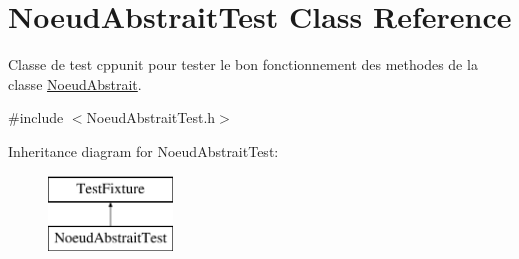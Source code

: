 \hypertarget{class_noeud_abstrait_test}{\section{Noeud\-Abstrait\-Test Class Reference}
\label{class_noeud_abstrait_test}
}


Classe de test cppunit pour tester le bon fonctionnement des methodes de la classe \hyperlink{class_noeud_abstrait}{Noeud\-Abstrait}.  




{\ttfamily \#include $<$Noeud\-Abstrait\-Test.\-h$>$}

Inheritance diagram for Noeud\-Abstrait\-Test\-:\begin{figure}[H]
\begin{center}
\leavevmode
\includegraphics[height=2.000000cm]{class_noeud_abstrait_test}
\end{center}
\end{figure}
